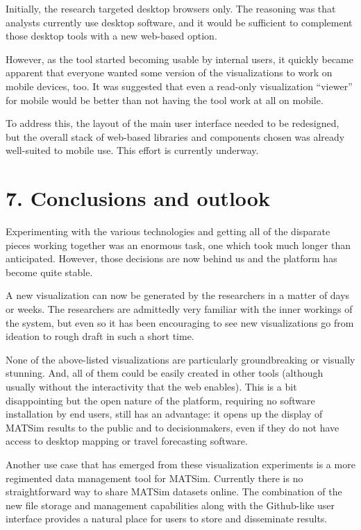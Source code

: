 Initially, the research targeted desktop browsers only. The reasoning
was that analysts currently use desktop software, and it would be
sufficient to complement those desktop tools with a new web-based
option.

However, as the tool started becoming usable by internal users, it
quickly became apparent that everyone wanted some version of the
visualizations to work on mobile devices, too. It was suggested that
even a read-only visualization ``viewer'' for mobile would be better
than not having the tool work at all on mobile.

To address this, the layout of the main user interface needed to be
redesigned, but the overall stack of web-based libraries and components
chosen was already well-suited to mobile use. This effort is currently
underway.

\hypertarget{conclusions-and-outlook}{%
\section{7. Conclusions and outlook}\label{conclusions-and-outlook}}

Experimenting with the various technologies and getting all of the
disparate pieces working together was an enormous task, one which took
much longer than anticipated. However, those decisions are now behind us
and the platform has become quite stable.

A new visualization can now be generated by the researchers in a matter
of days or weeks. The researchers are admittedly very familiar with the
inner workings of the system, but even so it has been encouraging to see
new visualizations go from ideation to rough draft in such a short time.

None of the above-listed visualizations are particularly groundbreaking
or visually stunning. And, all of them could be easily created in other
tools (although usually without the interactivity that the web enables).
This is a bit disappointing but the open nature of the platform,
requiring no software installation by end users, still has an advantage:
it opens up the display of MATSim results to the public and to
decisionmakers, even if they do not have access to desktop mapping or
travel forecasting software.

Another use case that has emerged from these visualization experiments
is a more regimented data management tool for MATSim. Currently there is
no straightforward way to share MATSim datasets online. The combination
of the new file storage and management capabilities along with the
Github-like user interface provides a natural place for users to store
and disseminate results.

